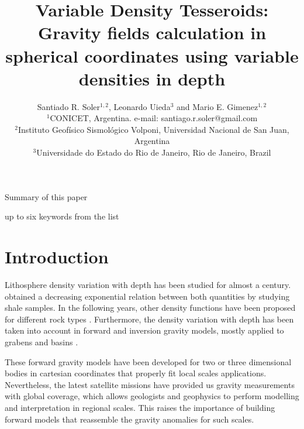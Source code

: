 \documentclass[extra]{gji}
\begin{document}
\title[Variable Density Tesseroids]{
    Variable Density Tesseroids: Gravity fields calculation in spherical coordinates using variable densities in depth
}
\author[S.R. Soler, L. Uieda and M.E. Gimenez]{
    Santiado R. Soler$^{1,2}$, Leonardo Uieda$^3$ and Mario E. Gimenez$^{1,2}$ \\
    $^1$CONICET, Argentina. e-mail: santiago.r.soler@gmail.com\\
    $^2$Instituto Geofísico Sismológico Volponi, Universidad Nacional de San Juan, Argentina\\
    $^3$Universidade do Estado do Rio de Janeiro, Rio de Janeiro, Brazil
    }


\maketitle

\begin{summary}
Summary of this paper 
\end{summary}

\begin{keywords}
up to six keywords from the list
\end{keywords}


\section{Introduction}

Lithosphere density variation with depth has been studied for almost a century. 
\citet{Athy1930} obtained a decreasing exponential relation between both quantities by studying shale samples.
In the following years, other density functions have been proposed for different rock types \citep[e.g.,][]{Maxant1980, Rao1986, Rao1993, Rao1994}.
Furthermore, the density variation with depth has been taken into account in forward and inversion gravity models, mostly applied to grabens and basins \citep{Cordell1973, Rao1986, Cowie1990, Rao1993, Rao1994, Zhang2001, Welford2010}.

These forward gravity models have been developed for two or three dimensional bodies in cartesian coordinates that properly fit local scales applications.
Nevertheless, the latest satellite missions have provided us gravity measurements with global coverage, which allows geologists and geophysics to perform modelling and interpretation in regional scales.
This raises the importance of building forward models that reassemble the gravity anomalies for such scales.
\end{document}
